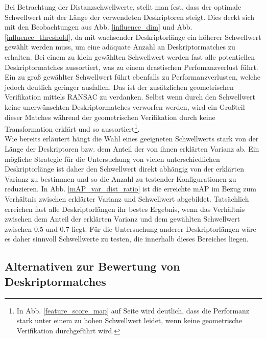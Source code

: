 Bei Betrachtung der Distanzschwellwerte, stellt man fest, dass der optimale Schwellwert mit der Länge der verwendeten Deskriptoren steigt. Dies deckt sich mit den Beobachtungen aus Abb. \ref{influence_dim} und Abb. \ref{influence_threshold}, da mit wachsender Deskriptorlänge ein höherer Schwellwert gewählt werden muss, um eine adäquate Anzahl an Deskriptormatches zu erhalten. Bei einem zu klein gewählten Schwellwert werden fast alle potentiellen Deskriptormatches aussortiert, was zu einem drastischen Perfomanzverlust führt. Ein zu groß gewählter Schwellwert führt ebenfalls zu Performanzverlusten, welche jedoch deutlich geringer ausfallen. Das ist der zusätzlichen geometrischen Verifikation mittels RANSAC zu verdanken. Selbst wenn durch den Schwellwert keine unerwünschten Deskriptormatches verworfen werden, wird ein Großteil dieser Matches während der geometrischen Verifikation durch keine Transformation erklärt und so aussortiert\footnote{In Abb. \ref{feature_score_map} auf Seite \pageref{feature_score_map} wird deutlich, dass die Performanz stark unter einem zu hohen Schwellwert leidet, wenn keine geometrische Verifikation durchgeführt wird.}. \\
Wie bereits erläutert hängt die Wahl eines geeigneten Schwellwerts stark von der Länge der Deskriptoren bzw. dem Anteil der von ihnen erklärten Varianz ab. Ein mögliche Strategie für die Untersuchung von vielen unterschiedlichen Deskriptorlänge ist daher den Schwellwert direkt abhängig von der erklärten Varianz zu bestimmen und so die Anzahl zu testender Konfigurationen zu reduzieren. In Abb. \ref{mAP_var_dist_ratio} ist die erreichte mAP im Bezug zum Verhältnis zwischen erklärter Varianz und Schwellwert abgebildet. Tatsächlich erreichen fast alle Deskriptorlängen ihr bestes Ergebnis, wenn das Verhältnis zwischen dem Anteil der erklärten Varianz und dem gewählten Schwellwert zwischen $0.5$ und $0.7$ liegt. Für die Untersuchung anderer Deskriptorlängen wäre es daher sinnvoll Schwellwerte zu testen, die innerhalb dieses Bereiches liegen.

\subsection{Alternativen zur Bewertung von Deskriptormatches}

